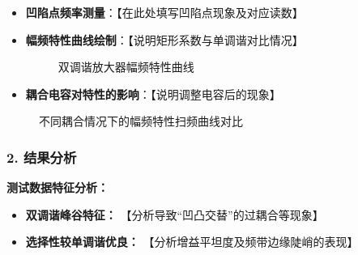 \documentclass[12pt]{article}
\begin{document}
\begin{itemize}
    \item[b.] \textbf{凹陷点频率测量}：【在此处填写凹陷点现象及对应读数】
    \item[c.] \textbf{幅频特性曲线绘制}：【说明矩形系数与单调谐对比情况】
    
    \begin{figure}[H]
    \centering
    \caption{双调谐放大器幅频特性曲线}
    \end{figure}
    
    \item[d.] \textbf{耦合电容对特性的影响}：【说明调整电容后的现象】
\end{itemize}

\begin{figure}[H]
    \centering
    \begin{minipage}[t]{0.32\textwidth}
        \centering
        \caption{耦合电容减小扫频曲线}
    \end{minipage}
    \hfill
    \begin{minipage}[t]{0.32\textwidth}
        \centering
        \caption{耦合电容为某一值时扫频曲线}
    \end{minipage}
    \hfill
    \begin{minipage}[t]{0.32\textwidth}
        \centering
        \caption{耦合电容增大扫频曲线}
    \end{minipage}
    \vspace{0.5em}
    \caption{不同耦合情况下的幅频特性扫频曲线对比}
\end{figure}

\subsubsection*{2. 结果分析}

\textbf{测试数据特征分析：}
\begin{itemize}
    \item \textbf{双调谐峰谷特征：} 【分析导致“凹凸交替”的过耦合等现象】
    \item \textbf{选择性较单调谐优良：} 【分析增益平坦度及频带边缘陡峭的表现】
\end{itemize}
\end{document}
